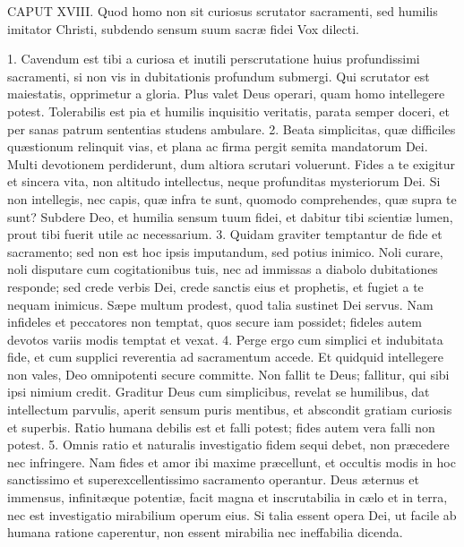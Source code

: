 \documentclass[twoside]{article}
\begin{document}
CAPUT XVIII.
Quod homo non sit curiosus scrutator sacramenti, sed humilis imitator Christi, subdendo sensum suum sacræ fidei
Vox dilecti.

1. Cavendum est tibi a curiosa et inutili perscrutatione huius profundissimi sacramenti, si non vis in dubitationis profundum submergi. Qui scrutator est maiestatis, opprimetur a gloria. Plus valet Deus operari, quam homo intellegere potest. Tolerabilis est pia et humilis inquisitio veritatis, parata semper doceri, et per sanas patrum sententias studens ambulare.
2. Beata simplicitas, quæ difficiles quæstionum relinquit vias, et plana ac firma pergit semita mandatorum Dei. Multi devotionem perdiderunt, dum altiora scrutari voluerunt. Fides a te exigitur et sincera vita, non altitudo intellectus, neque profunditas mysteriorum Dei. Si non intellegis, nec capis, quæ infra te sunt, quomodo comprehendes, quæ supra te sunt? Subdere Deo, et humilia sensum tuum fidei, et dabitur tibi scientiæ lumen, prout tibi fuerit utile ac necessarium.
3. Quidam graviter temptantur de fide et sacramento; sed non est hoc ipsis imputandum, sed potius inimico. Noli curare, noli disputare cum cogitationibus tuis, nec ad immissas a diabolo dubitationes responde; sed crede verbis Dei, crede sanctis eius et prophetis, et fugiet a te nequam inimicus. Sæpe multum prodest, quod talia sustinet Dei servus. Nam infideles et peccatores non temptat, quos secure iam possidet; fideles autem devotos variis modis temptat et vexat.
4. Perge ergo cum simplici et indubitata fide, et cum supplici reverentia ad sacramentum accede. Et quidquid intellegere non vales, Deo omnipotenti secure committe. Non fallit te Deus; fallitur, qui sibi ipsi nimium credit. Graditur Deus cum simplicibus, revelat se humilibus, dat intellectum parvulis, aperit sensum puris mentibus, et abscondit gratiam curiosis et superbis. Ratio humana debilis est et falli potest; fides autem vera falli non potest.
5. Omnis ratio et naturalis investigatio fidem sequi debet, non præcedere nec infringere. Nam fides et amor ibi maxime præcellunt, et occultis modis in hoc sanctissimo et superexcellentissimo sacramento operantur. Deus æternus et immensus, infinitæque potentiæ, facit magna et inscrutabilia in cælo et in terra, nec est investigatio mirabilium operum eius. Si talia essent opera Dei, ut facile ab humana ratione caperentur, non essent mirabilia nec ineffabilia dicenda.
\end{document}
